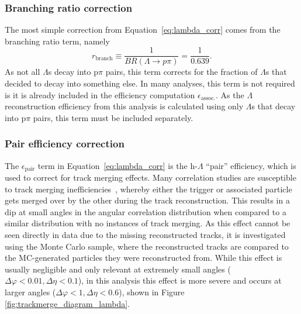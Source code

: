 \subsubsection{Branching ratio correction}

The most simple correction from Equation~\ref{eq:lambda_corr} comes from the branching ratio term, namely 
%
\begin{equation}
	r_{\text{branch}} \equiv \frac{1}{BR(\Lambda \rightarrow p\pi)} = \frac{1}{0.639}.
\end{equation}
%
As not all $\Lambda$s decay into p$\pi$ pairs, this term corrects for the fraction of $\Lambda$s that decided to decay into something else. In many analyses, this term is not required is it is already included in the efficiency computation $\epsilon_{\text{assoc.}}$. As the $\Lambda$ reconstruction efficiency from this analysis is calculated using only $\Lambda$s that decay into p$\pi$ pairs, this term must be included separately. 

\subsubsection{Pair efficiency correction}
\label{sec:pair_eff_corr}

The $\epsilon_{\text{pair}}$ term in Equation~\ref{eq:lambda_corr} is the h-$\Lambda$ ``pair'' efficiency, which is used to correct for track merging effects. Many correlation studies are susceptible to track merging inefficiencies~\cite{TwoTrack1, TwoTrack2}, whereby either the trigger or associated particle gets merged over by the other during the track reconstruction. This results in a dip at small angles in the angular correlation distribution when compared to a similar distribution with no instances of track merging. As this effect cannot be seen directly in data due to the missing reconstructed tracks, it is investigated using the Monte Carlo sample, where the reconstructed tracks are compared to the MC-generated particles they were reconstructed from. While this effect is usually negligible and only relevant at extremely small angles ($\Delta\varphi < 0.01, \Delta\eta < 0.1$), in this analysis this effect is more severe and occurs at larger angles ($\Delta\varphi < 1, \Delta\eta < 0.6$), shown in Figure \ref{fig:trackmerge_diagram_lambda}. 


